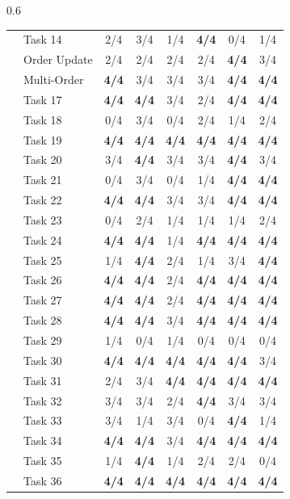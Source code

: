\begin{table}[t]
\begin{subtable}[t]{0.6\textwidth}
\begin{tabular}{@{}llcccccc@{}}
 & Task 14 & 2/4 & 3/4 & 1/4 & \textbf{4/4} & 0/4 & 1/4 \\
 & Order Update & 2/4 & 2/4 & 2/4 & 2/4 & \textbf{4/4} & 3/4 \\
 & Multi-Order & \textbf{4/4} & 3/4 & 3/4 & 3/4 & \textbf{4/4} & \textbf{4/4} \\
 & Task 17 & \textbf{4/4} & \textbf{4/4} & 3/4 & 2/4 & \textbf{4/4} & \textbf{4/4} \\
 & Task 18 & 0/4 & 3/4 & 0/4 & 2/4 & 1/4 & 2/4 \\
 & Task 19 & \textbf{4/4} & \textbf{4/4} & \textbf{4/4} & \textbf{4/4} & \textbf{4/4} & \textbf{4/4} \\
 & Task 20 & 3/4 & \textbf{4/4} & 3/4 & 3/4 & \textbf{4/4} & 3/4 \\
 & Task 21 & 0/4 & 3/4 & 0/4 & 1/4 & \textbf{4/4} & \textbf{4/4} \\
 & Task 22 & \textbf{4/4} & \textbf{4/4} & 3/4 & 3/4 & \textbf{4/4} & \textbf{4/4} \\
 & Task 23 & 0/4 & 2/4 & 1/4 & 1/4 & 1/4 & 2/4 \\
 & Task 24 & \textbf{4/4} & \textbf{4/4} & 1/4 & \textbf{4/4} & \textbf{4/4} & \textbf{4/4} \\
 & Task 25 & 1/4 & \textbf{4/4} & 2/4 & 1/4 & 3/4 & \textbf{4/4} \\
 & Task 26 & \textbf{4/4} & \textbf{4/4} & 2/4 & \textbf{4/4} & \textbf{4/4} & \textbf{4/4} \\
 & Task 27 & \textbf{4/4} & \textbf{4/4} & 2/4 & \textbf{4/4} & \textbf{4/4} & \textbf{4/4} \\
 & Task 28 & \textbf{4/4} & \textbf{4/4} & 3/4 & \textbf{4/4} & \textbf{4/4} & \textbf{4/4} \\
 & Task 29 & 1/4 & 0/4 & 1/4 & 0/4 & 0/4 & 0/4 \\
 & Task 30 & \textbf{4/4} & \textbf{4/4} & \textbf{4/4} & \textbf{4/4} & \textbf{4/4} & 3/4 \\
 & Task 31 & 2/4 & 3/4 & \textbf{4/4} & \textbf{4/4} & \textbf{4/4} & \textbf{4/4} \\
 & Task 32 & 3/4 & 3/4 & 2/4 & \textbf{4/4} & 3/4 & 3/4 \\
 & Task 33 & 3/4 & 1/4 & 3/4 & 0/4 & \textbf{4/4} & 1/4 \\
 & Task 34 & \textbf{4/4} & \textbf{4/4} & 3/4 & \textbf{4/4} & \textbf{4/4} & \textbf{4/4} \\
 & Task 35 & 1/4 & \textbf{4/4} & 1/4 & 2/4 & 2/4 & 0/4 \\
 & Task 36 & \textbf{4/4} & \textbf{4/4} & \textbf{4/4} & \textbf{4/4} & \textbf{4/4} & \textbf{4/4} \\

\end{tabular}
\end{subtable}
\end{table}
